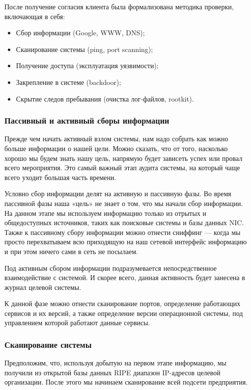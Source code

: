 После получение согласия клиента была формализована методика проверки, включающая в себя:

\begin{itemize}
	\item Сбор информации (Google, WWW, DNS);
	\item Сканирование системы (ping, port scanning);
	\item Получение доступа (эксплуатация уязвимости);
	\item Закрепление в системе (backdoor);
	\item Скрытие следов пребывания (очистка лог-файлов, rootkit).
\end{itemize}

\subsubsection{Пассивный и активный сборы информации}

Прежде чем начать активный взлом системы, нам надо собрать как можно больше информации о нашей цели. Можно сказать, что от того, насколько хорошо мы будем знать нашу цель, напрямую будет зависеть успех или провал всего мероприятия. Это самый важный этап аудита системы, на который чаще всего уходит большая часть времени.

Условно сбор информации делят на активную и пассивную фазы. Во время пассивной фазы наша «цель» не знает о том, что мы начали сбор информации. На данном этапе мы используем информацию только из отрытых и общедоступных источников, таких как поисковые системы и базы данных NIC. Также к пассивному сбору информации можно отнести сниффинг — когда мы просто перехватываем всю приходящую на наш сетевой интерфейс информацию и при этом ничего сами в сеть не посылаем.

Под активным сбором информации подразумевается непосредственное взаимодействие с системой. И скорее всего, данная активность будет занесена в журнал целевой системы.

К данной фазе можно отнести сканирование портов, определение работающих сервисов и их версий, а также определение версии операционной системы, под управлением которой работают данные сервисы.

\subsubsection{Сканирование системы}

Предположим, что, используя добытую на первом этапе информацию, мы получили из открытой базы данных RIPE диапазон IP-адресов целевой организации. После этого мы начинаем сканирование всей подсети предприятия.

